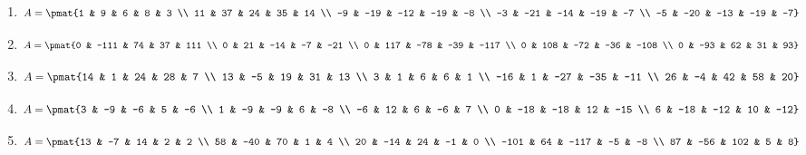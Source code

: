 \begin{enumerate}
\item

\begin{align*}
A = \pmat{1 & 9 & 6 & 8 & 3 \\ 11 & 37 & 24 & 35 & 14 \\ -9 & -19 & -12 & -19 & -8 \\ -3 & -21 & -14 & -19 & -7 \\ -5 & -20 & -13 & -19 & -7}
\end{align*}

\item

\begin{align*}
A = \pmat{0 & -111 & 74 & 37 & 111 \\ 0 & 21 & -14 & -7 & -21 \\ 0 & 117 & -78 & -39 & -117 \\ 0 & 108 & -72 & -36 & -108 \\ 0 & -93 & 62 & 31 & 93}
\end{align*}

\item

\begin{align*}
A = \pmat{14 & 1 & 24 & 28 & 7 \\ 13 & -5 & 19 & 31 & 13 \\ 3 & 1 & 6 & 6 & 1 \\ -16 & 1 & -27 & -35 & -11 \\ 26 & -4 & 42 & 58 & 20}
\end{align*}

\item

\begin{align*}
A = \pmat{3 & -9 & -6 & 5 & -6 \\ 1 & -9 & -9 & 6 & -8 \\ -6 & 12 & 6 & -6 & 7 \\ 0 & -18 & -18 & 12 & -15 \\ 6 & -18 & -12 & 10 & -12}
\end{align*}

\item

\begin{align*}
A = \pmat{13 & -7 & 14 & 2 & 2 \\ 58 & -40 & 70 & 1 & 4 \\ 20 & -14 & 24 & -1 & 0 \\ -101 & 64 & -117 & -5 & -8 \\ 87 & -56 & 102 & 5 & 8}
\end{align*}


\end{enumerate}
